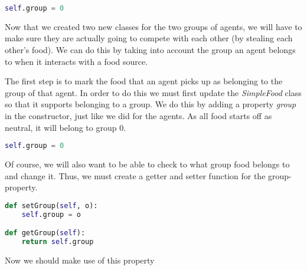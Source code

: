 \begin{lstlisting}[language=Python]
self.group = 0
\end{lstlisting}

Now that we created two new classes for the two groups of agents, we will have to make sure they are actually going to compete with each other (by stealing each other's food). We can do this by taking into account the group an agent belongs to when it interacts with a food source. 

The first step is to mark the food that an agent picks up as belonging to the group of that agent. In order to do this we must first update the \textit{SimpleFood} class so that it supports belonging to a group. We do this by adding a property \textit{group} in the constructor, just like we did for the agents. As all food starts off as neutral, it will belong to group 0. 


\begin{lstlisting}[language=Python]
self.group = 0
\end{lstlisting}

Of course, we will also want to be able to check to what group food belongs to and change it. Thus, we must create a getter and setter function for the group-property.


\begin{lstlisting}[language=Python]
def setGroup(self, o):
	self.group = o

def getGroup(self):
	return self.group
\end{lstlisting}

Now we should make use of this property 